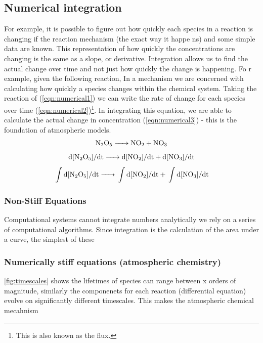 \subsection{Numerical integration}
For example, it is possible to figure out how quickly each species in a reaction is changing if the reaction mechanism (the exact way it happe ns) and some simple data are known. This representation of how quickly the concentrations are changing is the same as a slope, or derivative. Integration allows us to find the actual change over time and not just how quickly the change is happening. Fo r example, given the following reaction,
In a mechanism we are concerned with calculating how quickly a species changes within the chemical system. Taking the reaction of  (\autoref{eqn:numerical1}) we can write the rate of change for each species over time (\autoref{eqn:numerical2})\footnote{This is also known as the flux.}. In integrating this equation, we are able to calculate the actual change in concentration (\autoref{eqn:numerical3}) - this is the foundation of atmospheric models.
\begin{equation}
\ce{N2O5 ->	NO2} + \ce{NO3}
\label{eqn:numerical1}
\end{equation}
\begin{equation}
\ce{ d[N2O5]/dt ->	d[NO2]/dt} + \ce{d[NO3]/dt}
\label{eqn:numerical2}
\end{equation}
\begin{equation}
\ce{ \int d[N2O5]/dt ->	\int d[NO2]/dt} + \ce{\int d[NO3]/dt}
\label{eqn:numerical3}
\end{equation}
\subsubsection{Non-Stiff Equations}
Computational systems cannot integrate numbers analytically we rely on a series of computational algorithms. Since integration is the calculation of the area under a curve, the simplest of these
\subsubsection{Numerically stiff equations (atmospheric chemistry)}
\autoref{fig:timescales} shows the lifetimes of species can range between x orders of magnitude, similarly the componenets for each reaction (differential equation) evolve on significantly different timescales. This makes the atmospheric chemical mecahnism
